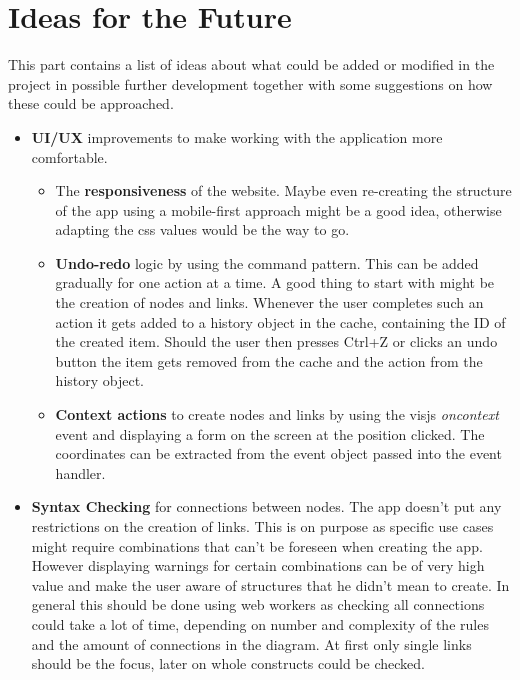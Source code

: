 \chapter{Ideas for the Future}
\label{chap:Future}
This part contains a list of ideas about what could be added or modified in the project in possible further development together with some suggestions on how these could be approached.
\begin{itemize}
\item \textbf{UI/UX} improvements to make working with the application more comfortable.
\begin{itemize}
\item The \textbf{responsiveness} of the website. Maybe even re-creating the structure of the app using a mobile-first approach might be a good idea, otherwise adapting the css values would be the way to go.

\item \textbf{Undo-redo} logic by using the command pattern. This can be added gradually for one action at a time. A good thing to start with might be the creation of nodes and links. Whenever the user completes such an action it gets added to a history object in the cache, containing the ID of the created item. Should the user then presses Ctrl+Z or clicks an undo button the item gets removed from the cache and the action from the history object.

\item \textbf{Context actions} to create nodes and links by using the visjs \emph{oncontext} event and displaying a form on the screen at the position clicked. The coordinates can be extracted from the event object passed into the event handler.
\end{itemize}

\item \textbf{Syntax Checking} for connections between nodes. The app doesn't put any restrictions on the creation of links. This is on purpose as specific use cases might require combinations that can't be foreseen when creating the app. However displaying warnings for certain combinations can be of very high value and make the user aware of structures that he didn't mean to create. In general this should be done using web workers as checking all connections could take a lot of time, depending on number and complexity of the rules and the amount of connections in the diagram. At first only single links should be the focus, later on whole constructs could be checked.


\end{itemize}
